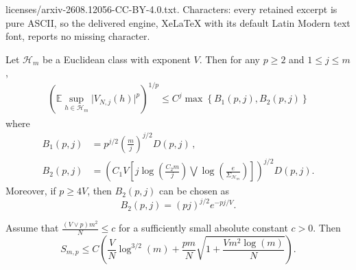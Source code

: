 \documentclass[10pt,a4paper]{amsart}
\def\l{\left}
\newcommand{\m}{\mathcal}
\newcommand{\mb}{\mathbb}
\def\r{\right}
\begin{document}
licenses/arxiv-2608.12056-CC-BY-4.0.txt. Characters: every retained excerpt is pure ASCII, so the delivered engine, XeLaTeX with its default Latin Modern text font, reports no missing character.
\begin{corollary}
\label{corollary:1}
Let $\m H_m$ be a Euclidean class with exponent $V$. Then for any $p \geq 2$ and $1 \leq j \leq m$,   
    \begin{align*}
    \l(\mb E \sup_{h \in \mathcal{H}_m} \lvert V_{N,j}(h) \rvert^p \r)^{1/p}  \leq C^j\max\l\{B_1(p,j), B_2(p,j)\r\} 
\end{align*}
where 
    \begin{align*}
    B_1(p,j) &= p^{j/2}\l(\frac{m}{j}\r)^{j/2} D(p,j)\,,
    \\
    B_2(p,j) &= 
    \l(C_1V \l[j\log\l(\frac{C_2m}{j}\r) \bigvee \log\l( \frac{e}{\Sigma_{\m H_m}}\r)\r]\r)^{j/2} D(p,j).
    \end{align*}
    Moreover, if $p\geq 4V$, then $B_2(p,j)$ can be chosen as
    \[
    B_2(p,j) = ( pj)^{j/2} e^{-pj/V}.
    \]
\end{corollary}

\begin{lemma}
\label{lemma:higher-order}
    Assume that $\frac{(V\vee p)m^2}{N}\leq c$ for a sufficiently small absolute constant $c>0$. Then
    \[
    S_{m,p} \leq C\l( \frac{V}{N}\log^{3/2}(m) + \frac{pm}{N}\sqrt{1+\frac{Vm^2\log(m)}{N}}\r).
    \]
\end{lemma}
\end{document}
